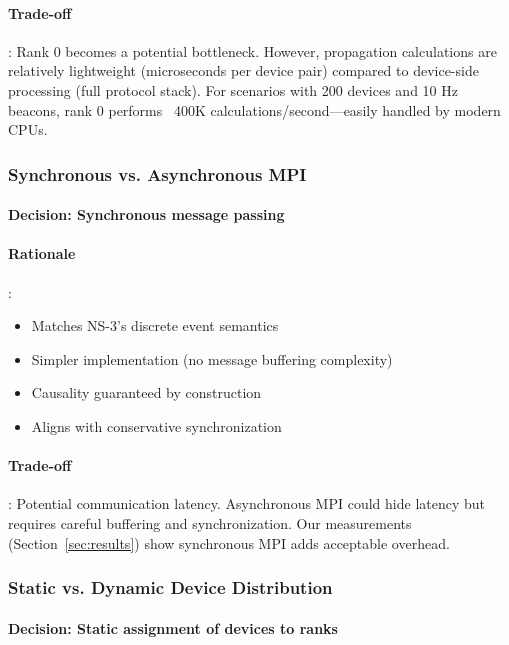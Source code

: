 \paragraph{Trade-off}:
Rank 0 becomes a potential bottleneck. However, propagation calculations are relatively lightweight (microseconds per device pair) compared to device-side processing (full protocol stack). For scenarios with 200 devices and 10 Hz beacons, rank 0 performs ~400K calculations/second—easily handled by modern CPUs.

\subsubsection{Synchronous vs. Asynchronous MPI}

\paragraph{Decision: Synchronous message passing}

\paragraph{Rationale}:
\begin{itemize}
    \item Matches NS-3's discrete event semantics
    \item Simpler implementation (no message buffering complexity)
    \item Causality guaranteed by construction
    \item Aligns with conservative synchronization
\end{itemize}

\paragraph{Trade-off}:
Potential communication latency. Asynchronous MPI could hide latency but requires careful buffering and synchronization. Our measurements (Section~\ref{sec:results}) show synchronous MPI adds acceptable overhead.

\subsubsection{Static vs. Dynamic Device Distribution}

\paragraph{Decision: Static assignment of devices to ranks}

